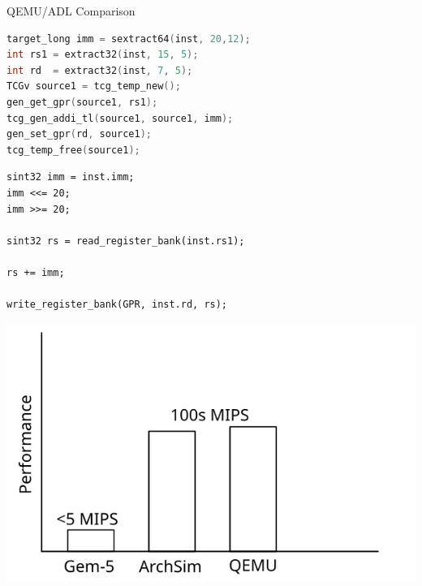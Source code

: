\begin{frame}[fragile]{QEMU/ADL Comparison}
    \begin{minipage}{0.48\textwidth}
        \begin{lstlisting}[language=C,basicstyle=\tt\tiny,frame=single]
target_long imm = sextract64(inst, 20,12);
int rs1 = extract32(inst, 15, 5);
int rd  = extract32(inst, 7, 5);
TCGv source1 = tcg_temp_new();
gen_get_gpr(source1, rs1);
tcg_gen_addi_tl(source1, source1, imm);
gen_set_gpr(rd, source1);
tcg_temp_free(source1);
        \end{lstlisting}
        
    \end{minipage} %
    \quad %
    \begin{minipage}{0.47\textwidth}
\begin{lstlisting}[basicstyle=\tt\tiny,frame=single]
sint32 imm = inst.imm;
imm <<= 20;
imm >>= 20;

sint32 rs = read_register_bank(inst.rs1);

rs += imm;

write_register_bank(GPR, inst.rd, rs);
    \end{lstlisting}
    \end{minipage}
\end{frame}

\begin{frame}
\centering
\includegraphics{figures/comparison-chart}
\end{frame}

